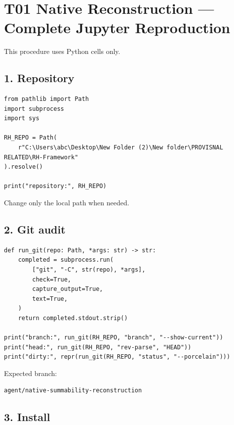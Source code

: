 \hypertarget{t01-native-reconstruction-complete-jupyter-reproduction}{%
\chapter{T01 Native Reconstruction --- Complete Jupyter Reproduction}\label{t01-native-reconstruction-complete-jupyter-reproduction}}

This procedure uses Python cells only.

\hypertarget{repository}{%
\section{1. Repository}\label{repository}}

\begin{verbatim}
from pathlib import Path
import subprocess
import sys

RH_REPO = Path(
    r"C:\Users\abc\Desktop\New Folder (2)\New folder\PROVISNAL RELATED\RH-Framework"
).resolve()

print("repository:", RH_REPO)
\end{verbatim}

Change only the local path when needed.

\hypertarget{git-audit}{%
\section{2. Git audit}\label{git-audit}}

\begin{verbatim}
def run_git(repo: Path, *args: str) -> str:
    completed = subprocess.run(
        ["git", "-C", str(repo), *args],
        check=True,
        capture_output=True,
        text=True,
    )
    return completed.stdout.strip()

print("branch:", run_git(RH_REPO, "branch", "--show-current"))
print("head:", run_git(RH_REPO, "rev-parse", "HEAD"))
print("dirty:", repr(run_git(RH_REPO, "status", "--porcelain")))
\end{verbatim}

Expected branch:

\begin{verbatim}
agent/native-summability-reconstruction
\end{verbatim}

\hypertarget{install}{%
\section{3. Install}\label{install}}

